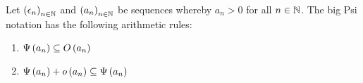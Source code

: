 \begin{theorem} \label{thm:bigpsi:rules}
  Let $\left({\epsilon_n}\right)_{{n}\in\mathbb N}$ and $\left({a_n}\right)_{{n}\in\mathbb N}$ be sequences whereby $a_n > 0$ for all $n\in\mathbb N$. The big Psi notation has the following arithmetic rules:

  \begin{enumerate}
    \item $\Psi\left( {a_n} \right) \subseteq O\left( {a_n} \right)$
    \item $\Psi\left( {a_n} \right) + o\left( {a_n} \right) \subseteq \Psi\left( {a_n} \right)$
  \end{enumerate}
\end{theorem}
